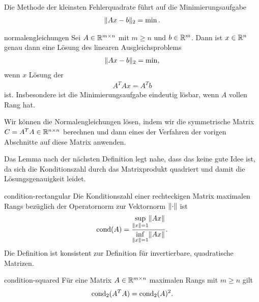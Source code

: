 \begin{intro}
  Die Methode der kleinsten Fehlerquadrate führt auf die Minimierungsaufgabe
  \begin{gather}
    \lVert Ax-b\rVert_2 = \min.
  \end{gather}
\end{intro}

\begin{Satz}{normalengleichungen}
  Sei $A\in \mathbb R^{m\times n}$ mit $m\ge n$ und $b\in \mathbb R^m$. Dann ist
  $x\in\mathbb R^n$ genau dann eine Lösung des linearen Ausgleichsproblems
  \begin{gather}
    \lVert Ax-b\rVert_2 = \min,
  \end{gather}
  wenn $x$ Lösung der 
  \begin{gather}
    A^TA x = A^Tb
  \end{gather}
  ist. Insbesondere ist die Minimierungsaufgabe eindeutig lösbar, wenn
  $A$ vollen Rang hat.
\end{Satz}

\begin{remark}
  Wir können die Normalengleichungen lösen, indem wir die symmetrische Matrix $C = A^TA\in \mathbb R^{n\times n}$ berechnen und dann eines der Verfahren der vorigen Abschnitte auf diese Matrix anwenden.
  
  Das Lemma nach der nächsten Definition legt nahe, dass das keine gute Idee ist, da sich die Konditionszahl durch das Matrixprodukt quadriert und damit die Lösungsgenauigkeit leidet.  
\end{remark}

\begin{Definition}{condition-rectangular}
  Die Konditionszahl einer rechteckigen Matrix maximalen Rangs bezüglich der Operatornorm zur Vektornorm $\lVert\cdot\rVert$ ist
  \begin{gather}
    \operatorname{cond}(A) = \frac{\sup\limits_{\lVert x\rVert=1}\lVert Ax\rVert}{\inf\limits_{\lVert x\rVert=1}\lVert Ax\rVert}.
    \end{gather}
  Die Definition ist konsistent zur Definition für invertierbare, quadratische Matrizen.
\end{Definition}

\begin{Lemma}{condition-squared}
  Für eine Matrix $A\in\mathbb R^{m\times n}$ maximalen Rangs mit $m\ge n$ gilt
  \begin{gather}
    \operatorname{cond}_2(A^TA) = \operatorname{cond}_2(A)^2.
  \end{gather}
\end{Lemma}

